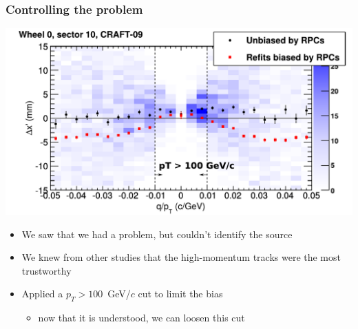 \documentclass[compress]{beamer}
\begin{document}
\begin{frame}
\frametitle{Controlling the problem}

\includegraphics[width=0.9\linewidth]{globaldistort_compare.pdf}

\begin{itemize}
\item We saw that we had a problem, but couldn't identify the source
\item We knew from other studies that the high-momentum tracks were the most trustworthy
\item Applied a $p_T > 100$~GeV/$c$ cut to limit the bias
\begin{itemize}
\item now that it is understood, we can loosen this cut
\end{itemize}
\end{itemize}
\end{frame}
\end{document}
